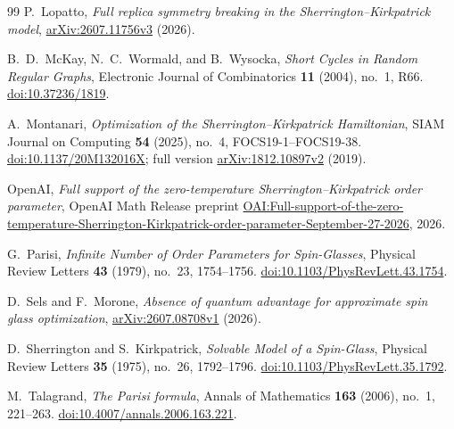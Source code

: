 \begin{thebibliography}{99}
P.~Lopatto,
\emph{Full replica symmetry breaking in the Sherrington--Kirkpatrick model},
\href{https://arxiv.org/abs/2607.11756v3}{arXiv:2607.11756v3} (2026).

B.~D.~McKay, N.~C.~Wormald, and B.~Wysocka,
\emph{Short Cycles in Random Regular Graphs},
Electronic Journal of Combinatorics \textbf{11} (2004), no.~1, R66.
\href{https://doi.org/10.37236/1819}{doi:10.37236/1819}.

A.~Montanari,
\emph{Optimization of the Sherrington--Kirkpatrick Hamiltonian},
SIAM Journal on Computing \textbf{54} (2025), no.~4, FOCS19-1--FOCS19-38.
\href{https://doi.org/10.1137/20M132016X}{doi:10.1137/20M132016X};
full version \href{https://arxiv.org/abs/1812.10897v2}{arXiv:1812.10897v2} (2019).

OpenAI,
\emph{Full support of the zero-temperature Sherrington--Kirkpatrick
order parameter},
OpenAI Math Release preprint
\href{https://github.com/openai/math/blob/main/preprints/Full-support-of-the-zero-temperature-Sherrington-Kirkpatrick-order-parameter-September-27-2026/main.pdf}{OAI:Full-support-of-the-zero-temperature-Sherrington-Kirkpatrick-order-parameter-September-27-2026},
2026.

G.~Parisi,
\emph{Infinite Number of Order Parameters for Spin-Glasses},
Physical Review Letters \textbf{43} (1979), no.~23, 1754--1756.
\href{https://doi.org/10.1103/PhysRevLett.43.1754}{doi:10.1103/PhysRevLett.43.1754}.

D.~Sels and F.~Morone,
\emph{Absence of quantum advantage for approximate spin glass optimization},
\href{https://arxiv.org/abs/2607.08708v1}{arXiv:2607.08708v1} (2026).

D.~Sherrington and S.~Kirkpatrick,
\emph{Solvable Model of a Spin-Glass},
Physical Review Letters \textbf{35} (1975), no.~26, 1792--1796.
\href{https://doi.org/10.1103/PhysRevLett.35.1792}{doi:10.1103/PhysRevLett.35.1792}.

M.~Talagrand,
\emph{The Parisi formula},
Annals of Mathematics \textbf{163} (2006), no.~1, 221--263.
\href{https://doi.org/10.4007/annals.2006.163.221}{doi:10.4007/annals.2006.163.221}.

\end{thebibliography}
